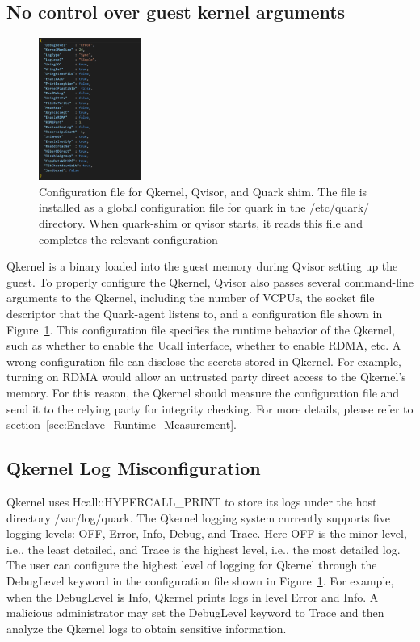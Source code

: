 \subsection{No control over guest kernel arguments}
\begin{figure}[htp]
  \centering
  \includegraphics[width=0.3\textwidth]{images/quark_config.PNG}
  \caption[Configuration file for Qkernel, Qvisor, and Quark shim]{Configuration file for Qkernel, Qvisor, and Quark shim. The file is installed as a global configuration file for quark in the /etc/quark/ directory. When quark-shim or qvisor starts, it reads this file and completes the relevant configuration}
  \label{fig:quark_config}
\end{figure}

Qkernel is a binary loaded into the guest memory during Qvisor setting up the guest. To properly configure the Qkernel, Qvisor also passes several command-line arguments to the Qkernel, including the number of VCPUs, the socket file descriptor that the Quark-agent listens to, and a configuration 
file shown in Figure~\ref{fig:quark_config}. This configuration file specifies the runtime behavior of the Qkernel, such as whether to enable the Ucall interface, whether to enable RDMA, etc. A wrong configuration file can disclose the secrets stored in Qkernel. For example, turning on RDMA would allow an untrusted 
party direct access to the Qkernel’s memory. For this reason, the Qkernel should measure the configuration file and send it to the relying party for integrity checking. For more details, please refer to section~\ref*{sec:Enclave_Runtime_Measurement}.

\subsection{Qkernel Log Misconfiguration}
\label{sec:Qkernel_Log_Misconfiguration}
Qkernel uses Hcall::HYPERCALL\_PRINT to store its logs under the host directory /var/log/quark. The Qkernel logging system currently supports five logging levels: OFF, Error, Info, Debug, and Trace. Here OFF is the minor level, i.e., the least detailed, and Trace is the highest level, i.e., 
the most detailed log. The user can configure the highest level of logging for Qkernel through the DebugLevel keyword in the configuration file shown in Figure~\ref{fig:quark_config}. For example, when the DebugLevel is Info, Qkernel prints logs in level Error and Info. A malicious administrator may set the 
DebugLevel keyword to Trace and then analyze the Qkernel logs to obtain sensitive information.

